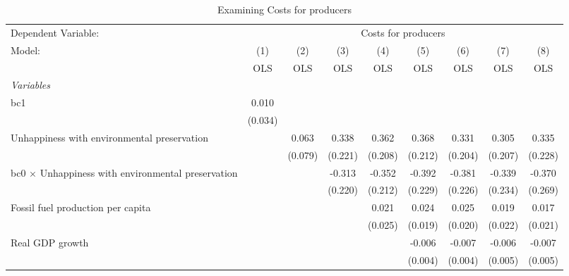 
\begin{table}[htbp]
   \caption{Examining Costs for producers}
   \centering
   \begin{tabular}{lcccccccc}
      \toprule
      Dependent Variable: & \multicolumn{8}{c}{Costs for producers}\\
      Model:                                                    & (1)     & (2)     & (3)     & (4)     & (5)     & (6)     & (7)           & (8)\\  
                                                                &  OLS    & OLS     & OLS     & OLS     & OLS     & OLS     & OLS           & OLS\\  
      \midrule
      \emph{Variables}\\
      bc1                                                       & 0.010   &         &         &         &         &         &               &   \\   
                                                                & (0.034) &         &         &         &         &         &               &   \\   
      Unhappiness with environmental preservation               &         & 0.063   & 0.338   & 0.362   & 0.368   & 0.331   & 0.305         & 0.335\\   
                                                                &         & (0.079) & (0.221) & (0.208) & (0.212) & (0.204) & (0.207)       & (0.228)\\   
      bc0 $\times$ Unhappiness with environmental preservation  &         &         & -0.313  & -0.352  & -0.392  & -0.381  & -0.339        & -0.370\\   
                                                                &         &         & (0.220) & (0.212) & (0.229) & (0.226) & (0.234)       & (0.269)\\   
      Fossil fuel production per capita                         &         &         &         & 0.021   & 0.024   & 0.025   & 0.019         & 0.017\\   
                                                                &         &         &         & (0.025) & (0.019) & (0.020) & (0.022)       & (0.021)\\   
      Real GDP growth                                           &         &         &         &         & -0.006  & -0.007  & -0.006        & -0.007\\   
                                                                &         &         &         &         & (0.004) & (0.004) & (0.005)       & (0.005)\\   

\end{tabular}
\end{table}
